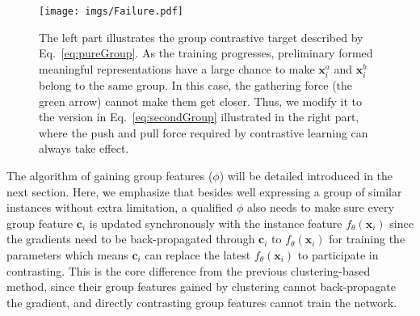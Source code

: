\documentclass[runningheads]{style/llncs}
\begin{document}
\begin{wrapfigure}[22]{r}{0.6\linewidth}
	\vspace{-0.32in}
	\texttt{[image: imgs/Failure.pdf]}
	\caption{The left part illustrates the group contrastive target described by Eq.~\ref{eq:pureGroup}. As the training progresses, preliminary formed meaningful representations have a large chance to make $\mathbf{x}_i^a$ and $\mathbf{x}_i^b$ belong to the same group. In this case, the gathering force (the green arrow) cannot make them get closer. Thus, we modify it to the version in Eq.~\ref{eq:secondGroup} illustrated in the right part, where the push and pull force required by contrastive learning can always take effect.}
	\label{fig:exp_fail}
\end{wrapfigure}

The algorithm of gaining group features ($\phi$) will be detailed introduced in the next section. Here, we emphasize that besides well expressing a group of similar instances without extra limitation, a qualified $\phi$ also needs to make sure every group feature $\mathbf{c}_i$ is updated synchronously with the instance feature $f_\theta(\mathbf{x}_i)$ since the gradients need to be back-propagated through $\mathbf{c}_i$ to $f_\theta(\mathbf{x}_i)$ for training the parameters which means $\mathbf{c}_i$ can replace the latest $f_\theta(\mathbf{x}_i)$ to participate in contrasting. This is the core difference from the previous clustering-based method, since their group features gained by clustering cannot back-propagate the gradient, and directly contrasting group features cannot train the network.
\end{document}
